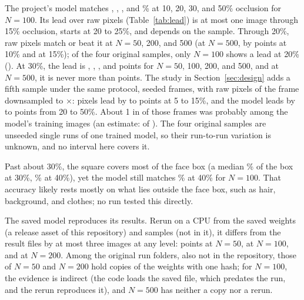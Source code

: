 The project's model matches , , , and \% at 10, 20, 30, and 50\% occlusion for $N=100$. Its lead over raw pixels (Table~\ref{tab:lead}) is at most one image through 15\% occlusion, starts at 20 to 25\%, and depends on the sample. Through 20\%, raw pixels match or beat it at $N=50$, 200, and 500 (at $N=500$, by  points at 10\% and  at 15\%); of the four original samples, only $N=100$ shows a lead at 20\% (). At 30\%, the lead is , , , and  points for $N=50$, 100, 200, and 500, and at $N=500$, it is never more than  points. The study in Section~\ref{sec:design} adds a fifth sample under the same protocol,  seeded frames, with raw pixels of the frame downsampled to $\times$: pixels lead by  to  points at 5 to 15\%, and the model leads by  to  points from 20 to 50\%. About 1 in  of those frames was probably among the model's training images (an estimate:  of ). The four original samples are unseeded single runs of one trained model, so their run-to-run variation is unknown, and no interval here covers it.

Past about 30\%, the square covers most of the face box (a median \% of the box at 30\%, \% at 40\%), yet the model still matches \% at 40\% for $N=100$. That accuracy likely rests mostly on what lies outside the face box, such as hair, background, and clothes; no run tested this directly.

\begin{table}[t]
\caption{The project's model minus raw pixels, in percentage points, under the original protocol. Columns $N=50$ to 500 are the original runs (one unseeded sample each); ``Study'' is the saved model on the study's  seeded gallery frames, against raw frame pixels downsampled to $\times$. Occlusion is the square's share of the frame.}
\label{tab:lead}
\centering\small

\end{table}

The saved model reproduces its results. Rerun on a CPU from the saved weights (a release asset of this repository) and samples (not in it), it differs from the result files by at most three images at any level:  points at $N=50$,  at $N=100$, and  at $N=200$. Among the original run folders, also not in the repository, those of $N=50$ and $N=200$ hold copies of the weights with one hash; for $N=100$, the evidence is indirect (the code loads the saved file, which predates the run, and the rerun reproduces it), and $N=500$ has neither a copy nor a rerun.

